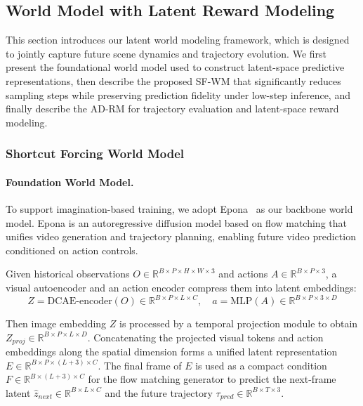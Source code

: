 \documentclass[runningheads]{llncs}
\begin{document}
\subsection{World Model with Latent Reward Modeling}

This section introduces our latent world modeling framework, which is designed to jointly capture future scene dynamics and trajectory evolution. We first present the foundational world model used to construct latent-space predictive representations, then describe the proposed SF-WM that significantly reduces sampling steps while preserving prediction fidelity under low-step inference, and finally describe the AD-RM for trajectory evaluation and latent-space reward modeling.
\subsubsection{Shortcut Forcing World Model}
\label{sect:wm}
\paragraph{\textbf{Foundation World Model.}}
To support imagination-based training, we adopt Epona~\cite{zhang2025epona} as our backbone world model. Epona is an autoregressive diffusion model based on flow matching that unifies video generation and trajectory planning, enabling future video prediction conditioned on action controls.

Given historical observations $O \in \mathbb{R}^{B \times P \times H \times W \times 3}$ and actions $A \in \mathbb{R}^{B \times P \times 3}$, a visual autoencoder and an action encoder compress them into latent embeddings:
\begin{equation}
Z = \text{DCAE-encoder}(O) \in \mathbb{R}^{B \times P \times L \times C}, \quad
a = \text{MLP}(A) \in \mathbb{R}^{B \times P \times 3 \times D}
\end{equation}

Then image embedding $Z$ is processed by a temporal projection module to obtain $Z_{proj} \in \mathbb{R}^{B \times P \times L \times D}$. Concatenating the projected visual tokens and action embeddings along the spatial dimension forms a unified latent representation $E \in \mathbb{R}^{B \times P \times (L+3) \times C}$. 
The final frame of $E$ is used as a compact condition $F \in \mathbb{R}^{B \times (L+3) \times C}$ for the flow matching generator to predict the next-frame latent $\hat{z}_{next} \in \mathbb{R}^{B \times L \times C}$ and the future trajectory $\tau_{pred} \in \mathbb{R}^{B \times T \times 3}$.
\end{document}
